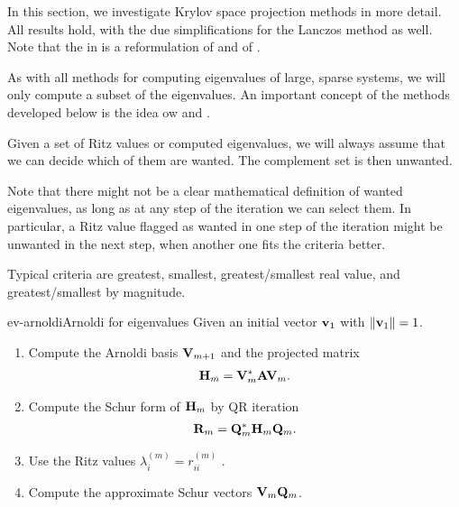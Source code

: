 
\begin{intro}
  In this section, we investigate Krylov space projection methods in
  more detail. All results hold, with the due simplifications for the
  Lanczos method as well. Note that the 
  in  is a reformulation
  of  and of
  .
\end{intro}

\begin{notation}
  As with all methods for computing eigenvalues of large, sparse
  systems, we will only compute a subset of the eigenvalues. An
  important concept of the methods developed below is the idea ow
   and .

  Given a set of Ritz values or computed eigenvalues, we will always
  assume that we can decide which of them are wanted. The complement
  set is then unwanted.

  Note that there might not be a clear mathematical definition of
  wanted eigenvalues, as long as at any step of the iteration we can
  select them. In particular, a Ritz value flagged as wanted in one
  step of the iteration might be unwanted in the next step, when
  another one fits the criteria better.

  Typical criteria are greatest, smallest, greatest/smallest real
  value, and greatest/smallest by magnitude.
\end{notation}

\begin{Algorithm*}{ev-arnoldi}{Arnoldi for eigenvalues}
  Given an initial vector $\mathbf v_1$ with $\lVert\mathbf v_1\rVert=1$.
  \begin{enumerate}
  \item Compute the Arnoldi basis $\mathbf V_{m+1}$ and the projected matrix
    \begin{gather}
      \mathbf H_m = \mathbf V_m^*\mathbf A\mathbf V_m.
    \end{gather}
  \item Compute the Schur form of $\mathbf H_m$ by QR iteration
    \begin{gather}
      \mathbf R_m = \mathbf Q_m^* \mathbf H_m\mathbf Q_m.
    \end{gather}
  \item Use the Ritz values $\lambda_i^{(m)}=r_{ii}^{(m)}$ .
  \item Compute the approximate Schur vectors $\mathbf V_m\mathbf Q_m$.
  \end{enumerate}
\end{Algorithm*}


